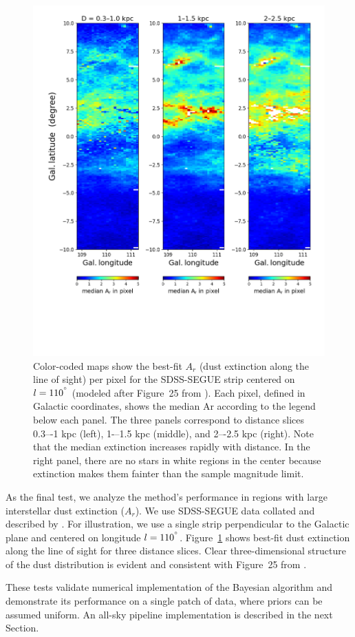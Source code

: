 \begin{figure}[ht!]
\hskip -0.2in
\includegraphics[width=1.06\textwidth,angle=0]{figures/qArSEGUEl110.png}
\vskip -1.4in
\caption{Color-coded maps show the best-fit $A_r$ (dust
  extinction along the line of sight) per pixel for the SDSS-SEGUE strip centered on $l = 110^{\degree}$
  (modeled after Figure~25 from \citealt{2012ApJ...757..166B}). Each pixel, defined in Galactic coordinates, shows the median Ar
  according to the legend below each panel.  The three panels  correspond to distance slices 0.3–-1 kpc (left), 1-–1.5 kpc (middle),
  and 2–-2.5 kpc (right). Note that the median extinction increases rapidly with distance. In the right panel, there are no stars in
  white regions in the center because extinction makes them fainter than the sample magnitude limit.
\label{fig:SEGUEdust}}
\end{figure}


As the final test, we analyze the method's performance in regions with large interstellar dust extinction ($A_r$). We use SDSS-SEGUE data
collated and described by \cite{2012ApJ...757..166B}. For illustration, we use a single strip perpendicular to the Galactic
plane and centered on longitude $l=110^{\degree}$. Figure~\ref{fig:SEGUEdust} shows best-fit dust extinction along the
line of sight for three distance slices. Clear three-dimensional structure of the dust distribution is evident and consistent with
Figure~25 from \cite{2012ApJ...757..166B}.
 
These tests validate numerical implementation of the Bayesian algorithm and demonstrate its performance on a single patch of data, where priors
can be assumed uniform. An all-sky pipeline implementation is described in the next Section.
